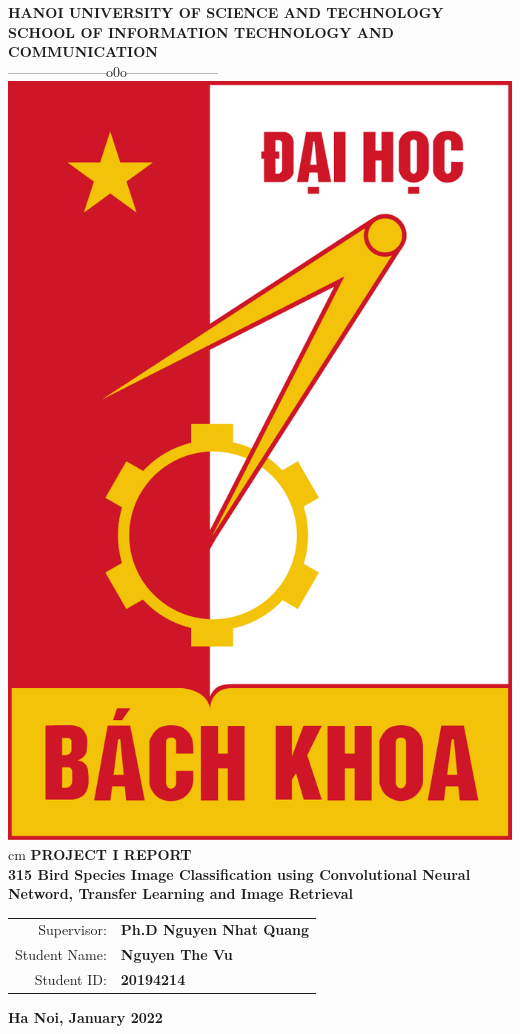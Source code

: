 \documentclass[runningheads]{llncs}
\begin{document}
 

\fontsize{13pt}{18pt}\selectfont   %

 
\begin{titlepage}                                               
\setlength{\baselineskip}{18truept}
\begin{center}
{\large\bf HANOI UNIVERSITY OF SCIENCE AND TECHNOLOGY}\\
{\large\bf SCHOOL OF INFORMATION TECHNOLOGY AND COMMUNICATION} \\
{---------------------o0o--------------------}
\vskip 1cm
\includegraphics[scale=0.4]{Figures/Logo HUST}
 cm
{\Large\bf PROJECT I REPORT}\\[1 cm]
{\Large\bf \textbf{315 Bird Species Image Classification using Convolutional Neural Netword, Transfer Learning and Image Retrieval}}\\
\vskip 1cm
\begin{tabular}{r l}
Supervisor:&{\bf Ph.D Nguyen Nhat Quang}\\[0.5cm]
Student Name:&{\bf Nguyen The Vu}\\[0.5cm]
Student ID:&{\bf 20194214}
\end{tabular}
\vfill
{\bf Ha Noi, January 2022}
\end{center}
\end{titlepage}
\end{document}
